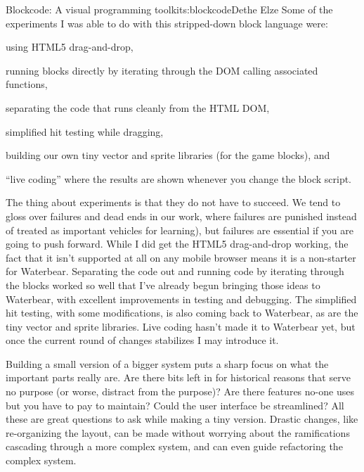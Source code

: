 \begin{aosachapter}{Blockcode: A visual programming toolkit}{s:blockcode}{Dethe Elze}
Some of the experiments I was able to do with this stripped-down block
language were:

\begin{aosaitemize}

\item
  using HTML5 drag-and-drop,
\item
  running blocks directly by iterating through the DOM calling
  associated functions,
\item
  separating the code that runs cleanly from the HTML DOM,
\item
  simplified hit testing while dragging,
\item
  building our own tiny vector and sprite libraries (for the game
  blocks), and
\item
  ``live coding'' where the results are shown whenever you change the
  block script.
\end{aosaitemize}

The thing about experiments is that they do not have to succeed. We tend
to gloss over failures and dead ends in our work, where failures are
punished instead of treated as important vehicles for learning), but
failures are essential if you are going to push forward. While I did get
the HTML5 drag-and-drop working, the fact that it isn't supported at all
on any mobile browser means it is a non-starter for Waterbear.
Separating the code out and running code by iterating through the blocks
worked so well that I've already begun bringing those ideas to
Waterbear, with excellent improvements in testing and debugging. The
simplified hit testing, with some modifications, is also coming back to
Waterbear, as are the tiny vector and sprite libraries. Live coding
hasn't made it to Waterbear yet, but once the current round of changes
stabilizes I may introduce it.

\label{what-are-we-trying-to-build-really}

Building a small version of a bigger system puts a sharp focus on what
the important parts really are. Are there bits left in for historical
reasons that serve no purpose (or worse, distract from the purpose)? Are
there features no-one uses but you have to pay to maintain? Could the
user interface be streamlined? All these are great questions to ask
while making a tiny version. Drastic changes, like re-organizing the
layout, can be made without worrying about the ramifications cascading
through a more complex system, and can even guide refactoring the
complex system.


\end{aosachapter}
